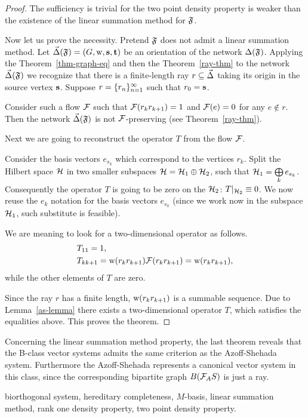 \documentclass[12pt]{amsart}
\begin{document}
      \begin{proof}
        The sufficiency is trivial for the two point density property is weaker than the existence of the linear summation method
          for $\fsys$.

        Now let us prove the necessity.
        Pretend $\fsys$ does not admit a linear summation method.
        Let $\onet(\fsys) = (G, \wtp, \source, \sink)$ be an orientation of the network $\net(\fsys)$.
        Applying the Theorem~\ref{thm-graph-eq} and then the Theorem~\ref{ray-thm} to the network $\onet(\fsys)$
          we recognize that there is a finite-length ray $r \subseteq \onet$ taking its origin
          in the source vertex $\source$.
        Suppose $r = \seq{r}$ such that $r_0 = \source$.

        Consider such a flow $\flowpos$ such that $\flowpos(r_k r_{k+1}) = 1$ and $\flowpos(e) = 0$ for any $e \not \in r$.
        Then the network $\onet(\fsys)$ is not $\flowpos$-preserving (see Theorem~\ref{ray-thm}).

        Next we are going to reconstruct the operator $T$ from the flow $\flowpos$.

        Consider the basis vectors $e_{s_k}$ which correspond to the vertices $r_k$.
        Split the Hilbert space $\cal{H}$ in two smaller subspaces $\cal{H} = \cal{H}_1 \oplus \cal{H}_2$,
          such that $\cal{H}_1 = \bigoplus\limits_k e_{s_k}$.
        Consequently the operator $T$ is going to be zero on the $\cal{H}_2$: $T\vert_{\cal{H}_2} \equiv 0$.
        We now reuse the $e_k$ notation for the basis vectors $e_{s_k}$ (since we work now in the subspace $\cal{H}_1$,
          such substitute is feasible).

        We are meaning to look for a two-dimensional operator as follows.
        \begin{align*}
          &T_{11} = 1,\\
          &T_{k k+1} = \wtp(r_k r_{k+1}) \flowpos(r_k r_{k+1}) = \wtp(r_k r_{k+1}),
        \end{align*}
          while the other elements of $T$ are zero.

        Since the ray $r$ has a finite length, $\wtp(r_k r_{k+1})$ is a summable sequence.
        Due to Lemma~\ref{as-lemma} there exists a two-dimensional operator $T$, which satisfies the equalities above.
        This proves the theorem.
    \end{proof}
    \begin{remark}
      Concerning the linear summation method property, the last theorem reveals that the B-class vector systems
        admits the same criterion as the Azoff-Shehada system.
      Furthermore the Azoff-Shehada represents a canonical vector system in this class, since the corresponding bipartite graph $B(\cal{F}_AS)$
        is just a ray.
    \end{remark}
\bigskip

\vspace{1em}
 biorthogonal system, hereditary completeness, $M$-basis, linear summation method, rank one density property, two point density property.
\end{document}
